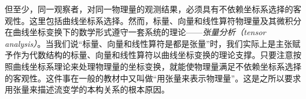 \documentclass[main.tex]{subfiles}
\begin{document}
但至少，同一观察者，对同一物理量的观测结果，必须具有不依赖坐标系选择的客观性。这里包括曲线坐标系选择。然而，标量、向量和线性算符物理量及其微积分在曲线坐标变换下的数学形式遵守一套系统的理论——\emph{张量分析（tensor analysis）}。当我们说“标量、向量和线性算符是都是张量”时，我们实际上是主张赋予作为代数结构的标量、向量和线性算符以曲线坐标变换的理论支撑。只要注意按照曲线坐标系理论来处理物理量的坐标变换，就能使物理量满足不依赖坐标系选择的客观性。这件事在一般的教材中又叫做“用张量来表示物理量”。这是之所以要求用张量来描述流变学的本构关系的根本原因。
\end{document}
